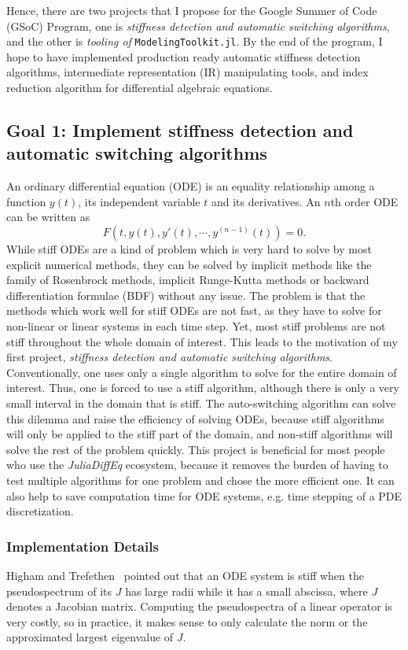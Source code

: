 \documentclass[12pt,a4paper]{article}
\begin{document}
Hence, there are two projects that I propose for the Google Summer of Code
(GSoC) Program, one is \textit{stiffness detection and automatic switching
algorithms}, and the other is \textit{tooling of} \texttt{ModelingToolkit.jl}.
By the end of the program, I hope to have implemented production ready
automatic stiffness detection algorithms, intermediate representation (IR)
manipulating tools, and index reduction algorithm for differential algebraic
equations.

\subsection{Goal 1: Implement stiffness detection and automatic switching
algorithms} \label{goal1}
An ordinary differential equation (ODE) is an equality relationship among a
function $y(t)$, its independent variable $t$ and its derivatives. An $n$th
order ODE can be written as
\begin{equation}
  F(t, y(t), y'(t), \cdots, y^{(n-1)}(t)) = 0.
\end{equation}
While stiff ODEs are a kind of problem which is very hard to solve by most
explicit numerical methods, they can be solved by implicit methods like the
family of Rosenbrock methods, implicit Runge-Kutta methods or backward
differentiation formulae (BDF) without any issue. The problem is that the
methods which work well for stiff ODEs are not fast, as they have to solve for
non-linear or linear systems in each time step. Yet, most stiff problems are
not stiff throughout the whole domain of interest. This leads to the motivation
of my first project, \textit{stiffness detection and automatic switching
algorithms}. Conventionally, one uses only a single algorithm to solve for the
entire domain of interest. Thus, one is forced to use a stiff algorithm,
although there is only a very small interval in the domain that is stiff. The
auto-switching algorithm can solve this dilemma and raise the efficiency of
solving ODEs, because stiff algorithms will only be applied to the stiff part
of the domain, and non-stiff algorithms will solve the rest of the problem
quickly. This project is beneficial for most people who use the
\textit{JuliaDiffEq} ecosystem, because it removes the burden of having to test
multiple algorithms for one problem and chose the more efficient one. It can
also help to save computation time for ODE systems, e.g. time stepping of a PDE
discretization.

\subsubsection{Implementation Details}
Higham and Trefethen~\cite{stiffode} pointed out that an ODE system is stiff
when the pseudospectrum of its $J$ has large radii while it has a small abscissa,
where $J$ denotes a Jacobian matrix. Computing the pseudospectra of a linear
operator is very costly, so in practice, it makes sense to only calculate the norm
or the approximated largest eigenvalue of $J$.
\end{document}
